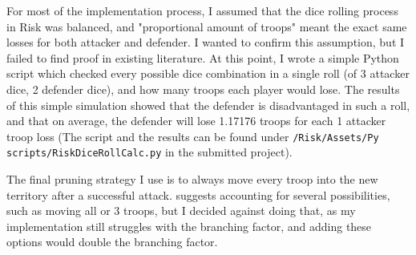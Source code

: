 For most of the implementation process, I assumed that the dice rolling process in Risk was balanced, and "proportional amount of troops" meant the exact same losses for both attacker and defender. I wanted to confirm this assumption, but I failed to find proof in existing literature. At this point, I wrote a simple Python script which checked every possible dice combination in a single roll (of 3 attacker dice, 2 defender dice), and how many troops each player would lose. The results of this simple simulation showed that the defender is disadvantaged in such a roll, and that on average, the defender will lose 1.17176 troops for each 1 attacker troop loss (The script and the results can be found under \texttt{/Risk/Assets/Py scripts/RiskDiceRollCalc.py} in the submitted project).

The final pruning strategy I use is to always move every troop into the new territory after a successful attack. \cite{limer2020monte} suggests accounting for several possibilities, such as moving all or 3 troops, but I decided against doing that, as my implementation still struggles with the branching factor, and adding these options would double the branching factor.